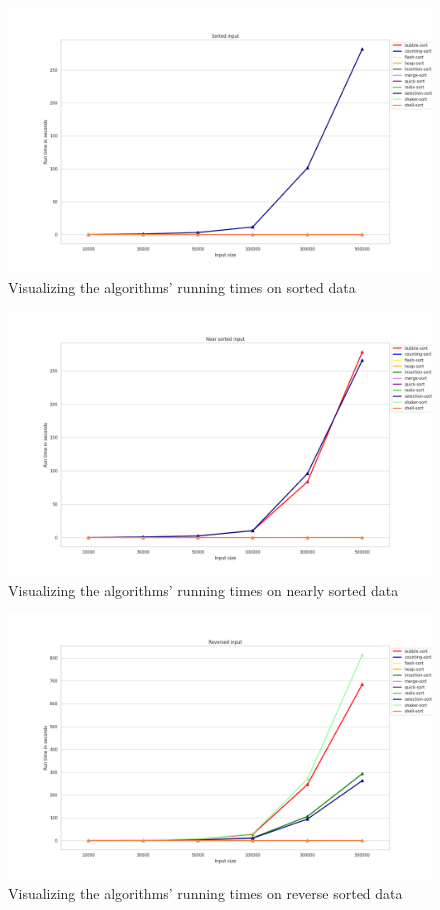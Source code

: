 \documentclass[11pt,a4paper]{article}
\begin{document}
\begin{figure}[H]
  \includegraphics[width = 16cm]{plot/sorted_line.png}
  \centering
  \caption{Visualizing the algorithms' running times on sorted data}
\end{figure}

\begin{figure}[H]
  \includegraphics[width = 16cm]{plot/nsorted_line.png}
  \centering
  \caption{Visualizing the algorithms' running times on nearly sorted data}
\end{figure}

\begin{figure}[H]
  \includegraphics[width = 16cm]{plot/rev_line.png}
  \centering
  \caption{Visualizing the algorithms' running times on reverse sorted data}
\end{figure}
\end{document}
